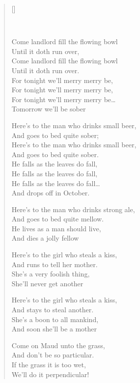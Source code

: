 \pagebreak
\settowidth{\versewidth}{For tonight we'll merry merry be}
\begin{verse}[\versewidth]

\\
\begin{chorus}
Come landlord fill the flowing bowl \\
Until it doth run over,\\
Come landlord fill the flowing bowl\\
Until it doth run over.\\
For tonight we'll merry merry be,\\
For tonight we'll merry merry be,\\
For tonight we'll merry merry be\dots{}\\
Tomorrow we'll be sober
\end{chorus}


Here's to the man who drinks small beer,\\
And goes to bed quite sober;\\
Here's to the man who drinks small beer, \\
And goes to bed quite sober.\\
He falls as the leaves do fall,\\
He falls as the leaves do fall,\\
He falls as the leaves do fall\dots{}\\
And drops off in October.

Here's to the man who drinks strong ale,\\
And goes to bed quite mellow.\\
He lives as a man should live,\\
And dies a jolly fellow

Here's to the girl who steals a kiss,\\
And runs to tell her mother.\\
She's a very foolish thing,\\
She'll never get another

Here's to the girl who steals a kiss,\\
And stays to steal another.\\
She's a boon to all mankind,\\
And soon she'll be a mother

Come on Maud unto the grass,\\
And don't be so particular.\\
If the grass it is too wet,\\
We'll do it perpendicular!
\end{verse}

